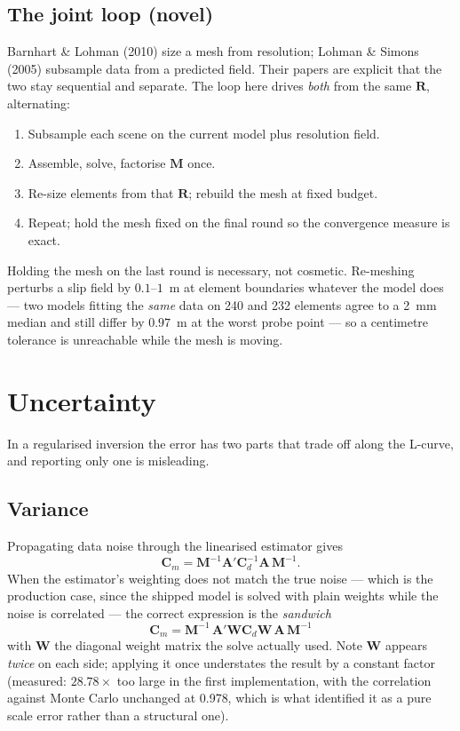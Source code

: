 \documentclass[11pt,a4paper]{article}
\newcommand{\R}{\mathbf{R}}
\newcommand{\A}{\mathbf{A}}
\newcommand{\Cd}{\mathbf{C}_d}
\newcommand{\Cm}{\mathbf{C}_m}
\newcommand{\M}{\mathbf{M}}
\newcommand{\W}{\mathbf{W}}
\begin{document}
\subsection{The joint loop (novel)}

Barnhart \& Lohman (2010) size a mesh from resolution; Lohman \& Simons (2005)
subsample data from a predicted field. Their papers are explicit that the two
stay sequential and separate. The loop here drives \emph{both} from the same
$\R$, alternating:

\begin{enumerate}\itemsep2pt
\item Subsample each scene on the current model plus resolution field.
\item Assemble, solve, factorise $\M$ once.
\item Re-size elements from that $\R$; rebuild the mesh at fixed budget.
\item Repeat; hold the mesh fixed on the final round so the convergence
      measure is exact.
\end{enumerate}

Holding the mesh on the last round is necessary, not cosmetic. Re-meshing
perturbs a slip field by $0.1$--$1$~m at element boundaries whatever the model
does --- two models fitting the \emph{same} data on 240 and 232 elements agree to
a 2~mm median and still differ by $0.97$~m at the worst probe point --- so a
centimetre tolerance is unreachable while the mesh is moving.

\section{Uncertainty}
\label{sec:unc}

In a regularised inversion the error has two parts that trade off along the
L-curve, and reporting only one is misleading.

\subsection{Variance}

Propagating data noise through the linearised estimator gives
\begin{equation}
\Cm = \M^{-1}\A'\Cd^{-1}\A\,\M^{-1} .
\label{eq:post}
\end{equation}
When the estimator's weighting does not match the true noise --- which is the
production case, since the shipped model is solved with plain weights while the
noise is correlated --- the correct expression is the \emph{sandwich}
\begin{equation}
\boxed{\;\Cm = \M^{-1}\,\A'\W\Cd\W\,\A\,\M^{-1}\;}
\label{eq:sandwich}
\end{equation}
with $\W$ the diagonal weight matrix the solve actually used. Note $\W$ appears
\emph{twice} on each side; applying it once understates the result by a
constant factor (measured: $28.78\times$ too large in the first implementation,
with the correlation against Monte Carlo unchanged at 0.978, which is what
identified it as a pure scale error rather than a structural one).
\end{document}
